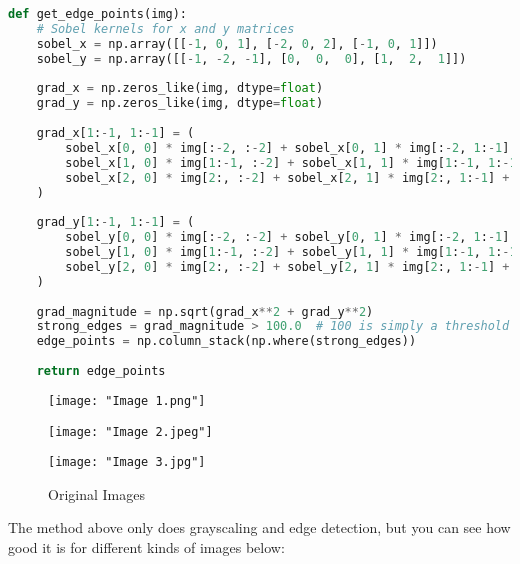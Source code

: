\documentclass{article}
\begin{document}
	\begin{lstlisting}[language=Python]
def get_edge_points(img):
	# Sobel kernels for x and y matrices
	sobel_x = np.array([[-1, 0, 1], [-2, 0, 2], [-1, 0, 1]])
	sobel_y = np.array([[-1, -2, -1], [0,  0,  0], [1,  2,  1]])
	
	grad_x = np.zeros_like(img, dtype=float)
	grad_y = np.zeros_like(img, dtype=float)
	
	grad_x[1:-1, 1:-1] = (
		sobel_x[0, 0] * img[:-2, :-2] + sobel_x[0, 1] * img[:-2, 1:-1] + sobel_x[0, 2] * img[:-2, 2:] +
		sobel_x[1, 0] * img[1:-1, :-2] + sobel_x[1, 1] * img[1:-1, 1:-1] + sobel_x[1, 2] * img[1:-1, 2:] +
		sobel_x[2, 0] * img[2:, :-2] + sobel_x[2, 1] * img[2:, 1:-1] + sobel_x[2, 2] * img[2:, 2:]
	)
	
	grad_y[1:-1, 1:-1] = (
		sobel_y[0, 0] * img[:-2, :-2] + sobel_y[0, 1] * img[:-2, 1:-1] + sobel_y[0, 2] * img[:-2, 2:] +
		sobel_y[1, 0] * img[1:-1, :-2] + sobel_y[1, 1] * img[1:-1, 1:-1] + sobel_y[1, 2] * img[1:-1, 2:] +
		sobel_y[2, 0] * img[2:, :-2] + sobel_y[2, 1] * img[2:, 1:-1] + sobel_y[2, 2] * img[2:, 2:]
	)
	
	grad_magnitude = np.sqrt(grad_x**2 + grad_y**2)
	strong_edges = grad_magnitude > 100.0  # 100 is simply a threshold for strong edges
	edge_points = np.column_stack(np.where(strong_edges))
	
	return edge_points\end{lstlisting}

	\begin{figure}[H]
		\centering
		\begin{minipage}{0.3\textwidth}
			\centering
			\texttt{[image: "Image 1.png"]}
		\end{minipage}%
		\hspace{0.05\textwidth}
		\begin{minipage}{0.25\textwidth}
			\centering
			\texttt{[image: "Image 2.jpeg"]}
		\end{minipage}%
		\hspace{0.05\textwidth} 
		\begin{minipage}{0.25\textwidth}
			\centering
			\texttt{[image: "Image 3.jpg"]}
		\end{minipage}
		\caption{Original Images}
	\end{figure}

	The method above only does grayscaling and edge detection, but you can see how good it is for different kinds of images below:
\end{document}
